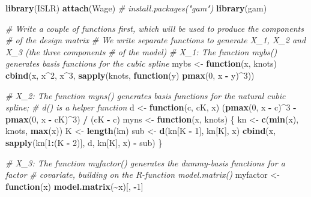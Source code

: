 \documentclass[
]{article}
\newenvironment{Shaded}{\begin{snugshade}}{\end{snugshade}}
\newcommand{\CommentTok}[1]{\textcolor[rgb]{0.56,0.35,0.01}{\textit{#1}}}
\newcommand{\ControlFlowTok}[1]{\textcolor[rgb]{0.13,0.29,0.53}{\textbf{#1}}}
\newcommand{\DecValTok}[1]{\textcolor[rgb]{0.00,0.00,0.81}{#1}}
\newcommand{\FunctionTok}[1]{\textcolor[rgb]{0.13,0.29,0.53}{\textbf{#1}}}
\newcommand{\NormalTok}[1]{#1}
\newcommand{\OtherTok}[1]{\textcolor[rgb]{0.56,0.35,0.01}{#1}}
\newcommand{\SpecialCharTok}[1]{\textcolor[rgb]{0.81,0.36,0.00}{\textbf{#1}}}
\begin{document}
\begin{Shaded}
\begin{Highlighting}[]
\FunctionTok{library}\NormalTok{(ISLR)}
\FunctionTok{attach}\NormalTok{(Wage)}
\CommentTok{\# install.packages("gam")}
\FunctionTok{library}\NormalTok{(gam)}

\CommentTok{\# Write a couple of functions first, which will be used to produce the components}
\CommentTok{\# of the design matrix}
\CommentTok{\# We write separate functions to generate X\_1, X\_2 and X\_3 (the three components}
\CommentTok{\# of the model)}
\CommentTok{\# X\_1: The function mybs() generates basis functions for the cubic spline}
\NormalTok{mybs }\OtherTok{\textless{}{-}} \ControlFlowTok{function}\NormalTok{(x, knots) }\FunctionTok{cbind}\NormalTok{(x, x}\SpecialCharTok{\^{}}\DecValTok{2}\NormalTok{, x}\SpecialCharTok{\^{}}\DecValTok{3}\NormalTok{, }\FunctionTok{sapply}\NormalTok{(knots, }\ControlFlowTok{function}\NormalTok{(y) }\FunctionTok{pmax}\NormalTok{(}\DecValTok{0}\NormalTok{, x }\SpecialCharTok{{-}}\NormalTok{ y)}\SpecialCharTok{\^{}}\DecValTok{3}\NormalTok{))}

\CommentTok{\# X\_2: The function myns() generates basis functions for the natural cubic spline;}
\CommentTok{\# d() is a helper function}
\NormalTok{d }\OtherTok{\textless{}{-}} \ControlFlowTok{function}\NormalTok{(c, cK, x) (}\FunctionTok{pmax}\NormalTok{(}\DecValTok{0}\NormalTok{, x }\SpecialCharTok{{-}}\NormalTok{ c)}\SpecialCharTok{\^{}}\DecValTok{3} \SpecialCharTok{{-}} \FunctionTok{pmax}\NormalTok{(}\DecValTok{0}\NormalTok{, x }\SpecialCharTok{{-}}\NormalTok{ cK)}\SpecialCharTok{\^{}}\DecValTok{3}\NormalTok{) }\SpecialCharTok{/}\NormalTok{ (cK }\SpecialCharTok{{-}}\NormalTok{ c)}
\NormalTok{myns }\OtherTok{\textless{}{-}} \ControlFlowTok{function}\NormalTok{(x, knots) \{}
\NormalTok{  kn }\OtherTok{\textless{}{-}} \FunctionTok{c}\NormalTok{(}\FunctionTok{min}\NormalTok{(x), knots, }\FunctionTok{max}\NormalTok{(x))}
\NormalTok{  K }\OtherTok{\textless{}{-}} \FunctionTok{length}\NormalTok{(kn)}
\NormalTok{  sub }\OtherTok{\textless{}{-}} \FunctionTok{d}\NormalTok{(kn[K }\SpecialCharTok{{-}} \DecValTok{1}\NormalTok{], kn[K], x)}
  \FunctionTok{cbind}\NormalTok{(x, }\FunctionTok{sapply}\NormalTok{(kn[}\DecValTok{1}\SpecialCharTok{:}\NormalTok{(K }\SpecialCharTok{{-}} \DecValTok{2}\NormalTok{)], d, kn[K], x) }\SpecialCharTok{{-}}\NormalTok{ sub)}
\NormalTok{\}}

\CommentTok{\# X\_3: The function myfactor() generates the dummy{-}basis functions for a factor}
\CommentTok{\# covariate, building on the R{-}function model.matrix()}
\NormalTok{myfactor }\OtherTok{\textless{}{-}} \ControlFlowTok{function}\NormalTok{(x) }\FunctionTok{model.matrix}\NormalTok{(}\SpecialCharTok{\textasciitilde{}}\NormalTok{x)[, }\SpecialCharTok{{-}}\DecValTok{1}\NormalTok{]}


\end{Highlighting}
\end{Shaded}
\end{document}
